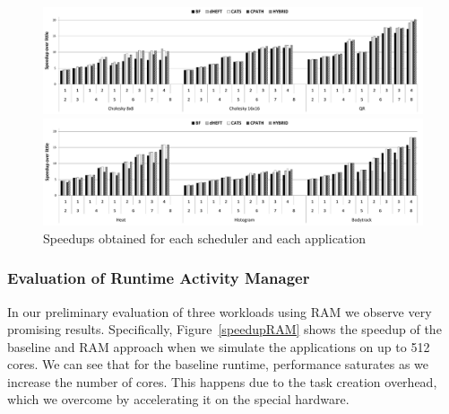 \begin{figure}[!t]
  \includegraphics[width=\textwidth]{Figs/speedup_apps1.pdf}
   \vspace{-0.4cm}

  \includegraphics[width=\textwidth]{Figs/speedup_apps2.pdf}
  \caption{Speedups obtained for each scheduler and each application}
  \label{speedup}
  \vspace{-0.4cm}
\end{figure}  

\subsubsection{Evaluation of Runtime Activity Manager}
In our preliminary evaluation of three workloads using RAM we observe very promising results.
Specifically, Figure~\ref{speedupRAM} shows the speedup of the baseline and RAM approach when we simulate the applications on up to 512 cores.
We can see that for the baseline runtime, performance saturates as we increase the number of cores. 
This happens due to the task creation overhead, which we overcome by accelerating it on the special hardware. 

